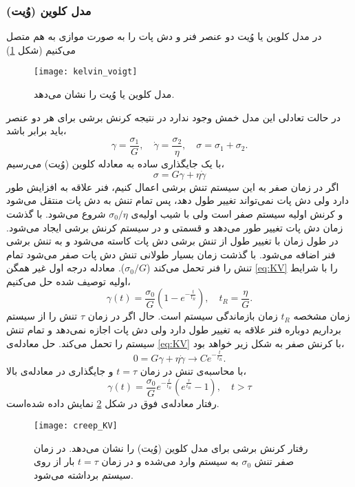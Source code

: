 \subsubsection{مدل کلوین (وُیت)}
در مدل کلوین یا وُیت دو عنصر فنر و دش پات را به صورت موازی به هم متصل می‌کنیم (شکل \ref{fig:KV})
\begin{figure}[htbp]
\begin{center}
\texttt{[image: kelvin\_voigt]}
\caption{
مدل کلوین یا وُیت را نشان می‌دهد.
}
\label{fig:KV}
\end{center}
\end{figure}
در حالت تعادلی این مدل خمش وجود ندارد در نتیجه کرنش برشی برای هر دو عنصر باید برابر باشد،
\begin{equation}
\gamma=\frac{\sigma_1}{G}, \quad \dot\gamma=\frac{\sigma_2}{\eta}, \quad \sigma=\sigma_1+\sigma_2.
\end{equation}
با یک جایگذاری ساده به معادله کلوین (وُیت) می‌رسیم،
\begin{equation}
\sigma=G\gamma+\eta\dot\gamma
\label{eq:KV}
\end{equation}
اگر در زمان صفر به این سیستم تنش برشی اعمال کنیم، فنر علاقه به افزایش طور دارد ولی دش پات نمی‌تواند تغییر طول دهد، پس تمام تنش به دش پات منتقل می‌شود و کرنش اولیه سیستم صفر است ولی با شیب اولیه‌ی $\sigma_0/\eta$ شروع می‌شود. با گذشت زمان دش پات تغییر طور می‌دهد و قسمتی و در سیستم کرنش برشی ایجاد می‌شود. در طول زمان با تغییر طول از  تنش برشی دش پات کاسته می‌شود و به تنش برشی فنر اضافه می‌شود. با گذشت زمان بسیار طولانی تنش دش پات صفر می‌شود تمام تنش را فنر تحمل می‌کند ($\sigma_0/G$).
معادله درجه اول غیر همگن \ref{eq:KV} را با شرایط اولیه توصیف شده حل می‌کنیم،
\begin{equation}
\gamma(t)=\frac{\sigma_0}{G}\left(1-e^{-\frac{t}{t_R}}\right), \quad t_R=\frac{\eta}{G}.
\end{equation}
زمان مشخصه $t_R$ زمان بازماندگی سیستم است. حال اگر در زمان $\tau$ تنش را از سیستم برداریم دوباره فنر علاقه به تغییر طول دارد ولی دش پات اجازه نمی‌دهد و تمام تنش سیستم را تحمل می‌کند. حل معادله‌ی \ref{eq:KV} با کرنش صفر به شکل زیر خواهد بود،
\begin{equation}
0=G\gamma+\eta\dot\gamma \rightarrow Ce^{-\frac{t}{t_R}}.
\end{equation}
با محاسبه‌ی تنش در زمان $t=\tau$ و جایگذاری در معادله‌ی بالا،
\begin{equation}
\gamma(t)=\frac{\sigma_0}{G}e^{-\frac{t}{t_R}}\left(e^{\frac{\tau}{t_R}}-1\right), \quad t>\tau
\end{equation}
رفتار معادله‌ی فوق در شکل \ref{fig:creep_KV} نمایش داده شده‌است.
\begin{figure}[htbp]
\begin{center}
\texttt{[image: creep\_KV]}
\caption{
رفتار کرنش برشی برای مدل کلوین (وُیت) را نشان می‌دهد. در زمان صفر تنش $\sigma_0$ به سیستم وارد می‌شده و در زمان $t=\tau$ بار از روی سیستم برداشته می‌شود.
}
\label{fig:creep_KV}
\end{center}
\end{figure}
